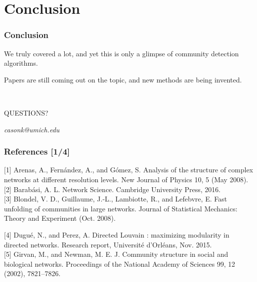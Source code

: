 \documentclass{beamer}
\newcommand{\XB}{\color{black}}
\newcommand{\XR}{\color{red}}
\begin{document}

\section{Conclusion}

\begin{frame}
    \frametitle{Conclusion}

    We truly covered a lot, and yet this is only a glimpse of community detection algorithms.\pause

    \vspace{2.5mm}
    Papers are still coming out on the topic, and new methods are being invented.\pause

    \hrulefill \\
    \Large{\centerline{\XR QUESTIONS?\XB}} 
    \normalsize{\centerline{\textit{casonk@umich.edu}}}

\end{frame}

\begin{frame}
    \frametitle{References [1/4]}

    [1] Arenas, A., Fern{\'{a}}ndez, A., and G{\'{o}}mez, S.
    Analysis of the structure of complex networks at
    different resolution levels. New Journal of Physics 10, 5
    (May 2008). \\

    [2] Barab{\'{a}}si, A. L. Network Science. Cambridge
    University Press, 2016. \\

    [3] Blondel, V. D., Guillaume, J.-L., Lambiotte, R.,
    and Lefebvre, E. Fast unfolding of communities in
    large networks. Journal of Statistical Mechanics: Theory
    and Experiment (Oct. 2008).

    [4] Dugu{\'{e}}, N., and Perez, A. Directed Louvain :
    maximizing modularity in directed networks. Research
    report, Universit{\'{e}} d'Orl{\'{e}}ans, Nov. 2015. \\

    [5] Girvan, M., and Newman, M. E. J. Community
    structure in social and biological networks. Proceedings
    of the National Academy of Sciences 99, 12 (2002),
    7821–7826.

\end{frame}
\end{document}
